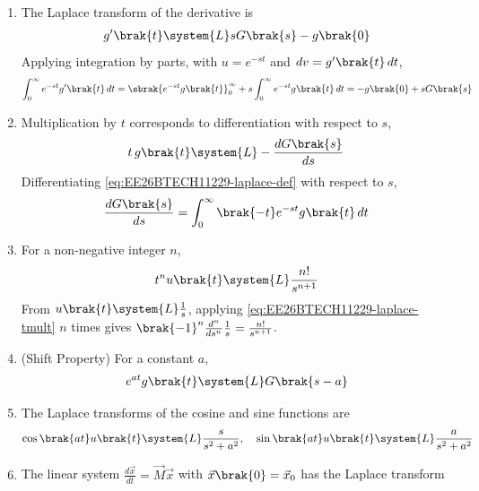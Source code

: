 \begin{enumerate}[label=\thesubsection.\arabic*, ref=\thesubsection.\theenumi]
\begin{align}
	\label{eq:EE26BTECH11229-laplace-def}
\end{align}
The independent variable can have any name, such as $y$.
\item The Laplace transform of the derivative is
\begin{align}
	g^{\prime}\brak{t} \system{L} sG\brak{s} - g\brak{0}
	\label{eq:EE26BTECH11229-laplace-deriv}
\end{align}
\solution
Applying integration by parts, with $u = e^{-st}$ and $dv = g^{\prime}\brak{t}\, dt$,
\begin{align}
	\int_{0}^{\infty}e^{-st}g^{\prime}\brak{t}\, dt = \sbrak{e^{-st}g\brak{t}}_{0}^{\infty} + s\int_{0}^{\infty}e^{-st}g\brak{t}\, dt = -g\brak{0} + sG\brak{s}
\end{align}
\item Multiplication by $t$ corresponds to differentiation with respect to $s$,
\begin{align}
	t\,g\brak{t} \system{L} -\frac{dG\brak{s}}{ds}
	\label{eq:EE26BTECH11229-laplace-tmult}
\end{align}
\solution
Differentiating \eqref{eq:EE26BTECH11229-laplace-def} with respect to $s$,
\begin{align}
	\frac{dG\brak{s}}{ds} = \int_{0}^{\infty}\brak{-t}e^{-st}g\brak{t}\, dt
\end{align}
\item For a non-negative integer $n$,
\begin{align}
	t^n u\brak{t} \system{L} \frac{n!}{s^{n+1}}
	\label{eq:EE26BTECH11229-laplace-power}
\end{align}
\solution
From $u\brak{t} \system{L} \frac{1}{s}$, applying \eqref{eq:EE26BTECH11229-laplace-tmult} $n$ times gives $\brak{-1}^n\frac{d^n}{ds^n}\frac{1}{s} = \frac{n!}{s^{n+1}}$.
\item (Shift Property) For a constant $a$,
\begin{align}
	e^{at}g\brak{t} \system{L} G\brak{s - a}
	\label{eq:EE26BTECH11229-laplace-shift}
\end{align}
\item The Laplace transforms of the cosine and sine functions are
\begin{align}
	\cos\brak{at}u\brak{t} \system{L} \frac{s}{s^2 + a^2}, \quad
	\sin\brak{at}u\brak{t} \system{L} \frac{a}{s^2 + a^2}
	\label{eq:EE26BTECH11229-laplace-sincos}
\end{align}
\item The linear system $\frac{d\vec{x}}{dt} = \vec{M}\vec{x}$ with $\vec{x}\brak{0} = \vec{x}_0$ has the Laplace transform

\end{enumerate}
